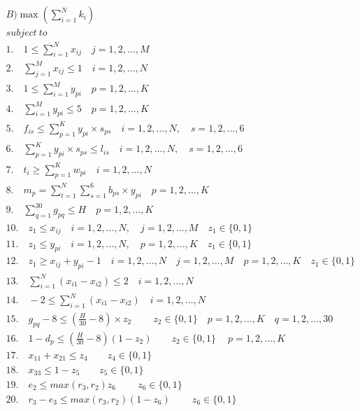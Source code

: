\documentclass[11pt]{article}
\begin{document}
{{\begin{mdframed}[style=MyFrame]
{{\begin{align}
    B) \max\left(\sum_{i=1}^{N} k_i\right) \\
    subject\  to\\
    1.\quad 1 \leq \sum_{i=1}^{N} x_{ij} \quad j=1,2,\dots,M \ \\
    2.\quad \sum_{j=1}^{M} x_{ij} \leq 1 \quad i=1,2,\dots,N \ \\
    3.\quad 1 \leq \sum_{i=1}^{M} y_{pi} \quad p=1,2,\dots,K \ \\
    4.\quad  \sum_{i=1}^{M} y_{pi} \leq 5 \quad p=1,2,\dots,K \ \\
    5.\quad f_{is} \leq \sum_{p=1}^{K} y_{pi} \times s_{ps} \quad i=1,2,\dots,N, \quad s=1,2,\dots,6 \ \\
    6.\quad \sum_{p=1}^{K} y_{pi} \times s_{ps} \leq l_{is} \quad i=1,2,\dots,N, \quad s=1,2,\dots,6 \ \\
    7.\quad t_i \geq \sum_{p=1}^{K} w_{pi} \quad i=1,2,\dots,N \ \\
    8.\quad m_p = \sum_{t=1}^{N} \sum_{s=1}^{6} b_{ps} \times y_{pi} \quad p=1,2,\dots,K \ \\
    9.\quad \sum_{q=1}^{30} g_{pq} \leq H \quad p=1,2,\dots,K \ \\
    10.\quad z_{1} \leq x_{ij} \quad i=1,2,\dots,N, \quad j=1,2,\dots,M \quad z_{1} \in \{0, 1\} \ \\
    11.\quad z_{1} \leq y_{pi} \quad i=1,2,\dots,N, \quad p=1,2,\dots,K \quad z_{1} \in \{0, 1\}  \ \\
    12.\quad z_{1} \geq x_{ij} + y_{pi} - 1 \quad i=1,2,\dots,N \quad j=1,2,\dots,M \quad p=1,2,\dots,K \quad z_{1} \in \{0, 1\} 
    \ \\
    13.\quad \sum_{i=1}^{N}(x_{i1}-x_{i2}) \leq 2 \quad i=1,2,\dots,N
    \ \\
    14.\quad -2 \leq \sum_{i=1}^{N}(x_{i1}-x_{i2}) \quad i=1,2,\dots,N
    \ \\
    15.\quad g_{pq} - 8 \leq (\frac{H}{30} - 8) \times z_{2}\ \qquad z_{2} \in \{0,1\}\quad p=1,2,\dots,K\quad q=1,2,\dots,30\\
    16.\quad 1 - d_p \leq (\frac{H}{30} - 8)(1-z_{2}) \qquad z_{2} \in \{0,1\} \ \quad p=1,2,\dots,K \\
    17.\quad x_{11} + x_{21} \leq z_{4} \qquad z_{4} \in \{0,1\} \ \\
    18.\quad x_{33} \leq 1 - z_{5} \qquad z_{5} \in \{0,1\} \ \ \\
    19.\quad e_{2} \leq max(r_{3}, r_{2})z_{6} \ \qquad z_{6} \in \{0,1\} \\
    20.\quad r_{3} - e_{3} \leq max(r_{3},r_{2}) (1-z_{6}) \ \qquad z_{6} \in \{0,1\} \\

\end{align}}}
\end{mdframed}}}
\end{document}
